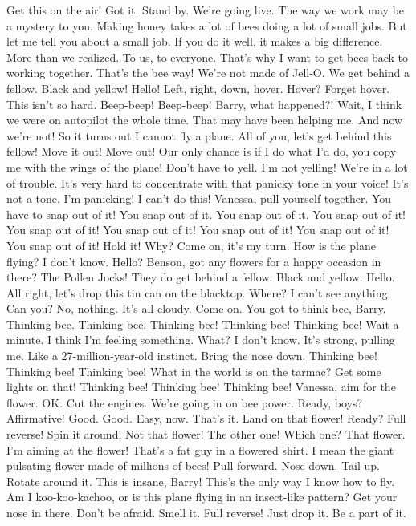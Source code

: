 \documentclass[a4paper,12pt]{article}
\begin{document}
Get this on the air!
Got it.
Stand by.
We're going live.
The way we work may be a mystery to you. Making honey takes a lot of bees doing a lot of small jobs.
But let me tell you about a small job. If you do it well, it makes a big difference.
More than we realized. To us, to everyone.
That's why I want to get bees back to working together. That's the bee way! We're not made of Jell-O.
We get behind a fellow.
Black and yellow!
Hello!
Left, right, down, hover.
Hover?
Forget hover.
This isn't so hard.
Beep-beep! Beep-beep!
Barry, what happened?!
Wait, I think we were on autopilot the whole time.
That may have been helping me.
And now we're not!
So it turns out I cannot fly a plane.
All of you, let's get behind this fellow! Move it out!
Move out!
Our only chance is if I do what I'd do, you copy me with the wings of the plane!
Don't have to yell.
I'm not yelling! We're in a lot of trouble.
It's very hard to concentrate with that panicky tone in your voice!
It's not a tone. I'm panicking!
I can't do this!
Vanessa, pull yourself together. You have to snap out of it!
You snap out of it.
You snap out of it.
You snap out of it!
You snap out of it!
You snap out of it!
You snap out of it!
You snap out of it!
You snap out of it!
Hold it!
Why? Come on, it's my turn.
How is the plane flying?
I don't know.
Hello?
Benson, got any flowers for a happy occasion in there?
The Pollen Jocks!
They do get behind a fellow.
Black and yellow.
Hello.
All right, let's drop this tin can on the blacktop.
Where? I can't see anything. Can you?
No, nothing. It's all cloudy.
Come on. You got to think bee, Barry.
Thinking bee.
Thinking bee.
Thinking bee!
Thinking bee! Thinking bee!
Wait a minute. I think I'm feeling something.
What?
I don't know. It's strong, pulling me.
Like a 27-million-year-old instinct.
Bring the nose down.
Thinking bee!
Thinking bee! Thinking bee!
What in the world is on the tarmac?
Get some lights on that!
Thinking bee!
Thinking bee! Thinking bee!
Vanessa, aim for the flower.
OK.
Cut the engines. We're going in on bee power. Ready, boys?
Affirmative!
Good. Good. Easy, now. That's it.
Land on that flower!
Ready? Full reverse!
Spin it around!
Not that flower! The other one!
Which one?
That flower.
I'm aiming at the flower!
That's a fat guy in a flowered shirt.
I mean the giant pulsating flower made of millions of bees!
Pull forward. Nose down. Tail up.
Rotate around it.
This is insane, Barry!
This's the only way I know how to fly.
Am I koo-koo-kachoo, or is this plane flying in an insect-like pattern?
Get your nose in there. Don't be afraid. Smell it. Full reverse!
Just drop it. Be a part of it.
\end{document}
